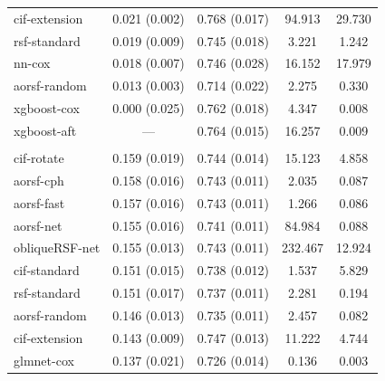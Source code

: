 \documentclass[twoside,11pt]{article}\usepackage[]{graphicx}\usepackage[]{xcolor}
\newenvironment{knitrout}{}{} %
\begin{document}
\begin{knitrout}
\begin{longtable}[t]{lcccc}
\hspace{1em}cif-extension & 0.021 (0.002) & 0.768 (0.017) & 94.913 & 29.730\\
\hspace{1em}rsf-standard & 0.019 (0.009) & 0.745 (0.018) & 3.221 & 1.242\\
\hspace{1em}nn-cox & 0.018 (0.007) & 0.746 (0.028) & 16.152 & 17.979\\
\hspace{1em}aorsf-random & 0.013 (0.003) & 0.714 (0.022) & 2.275 & 0.330\\
\hspace{1em}xgboost-cox & 0.000 (0.025) & 0.762 (0.018) & 4.347 & 0.008\\
\hspace{1em}xgboost-aft & --- & 0.764 (0.015) & 16.257 & 0.009\\
\addlinespace[0.3em]
\multicolumn{5}{l}{\textit{\textbf{Monoclonal gammopathy; death, n = 1384, p = 8}}}\\
\hline
\hspace{1em}cif-rotate & 0.159 (0.019) & 0.744 (0.014) & 15.123 & 4.858\\
\hspace{1em}aorsf-cph & 0.158 (0.016) & 0.743 (0.011) & 2.035 & 0.087\\
\hspace{1em}aorsf-fast & 0.157 (0.016) & 0.743 (0.011) & 1.266 & 0.086\\
\hspace{1em}aorsf-net & 0.155 (0.016) & 0.741 (0.011) & 84.984 & 0.088\\
\hspace{1em}obliqueRSF-net & 0.155 (0.013) & 0.743 (0.011) & 232.467 & 12.924\\
\hspace{1em}cif-standard & 0.151 (0.015) & 0.738 (0.012) & 1.537 & 5.829\\
\hspace{1em}rsf-standard & 0.151 (0.017) & 0.737 (0.011) & 2.281 & 0.194\\
\hspace{1em}aorsf-random & 0.146 (0.013) & 0.735 (0.011) & 2.457 & 0.082\\
\hspace{1em}cif-extension & 0.143 (0.009) & 0.747 (0.013) & 11.222 & 4.744\\
\hspace{1em}glmnet-cox & 0.137 (0.021) & 0.726 (0.014) & 0.136 & 0.003\\

\end{longtable}
\end{knitrout}
\end{document}

